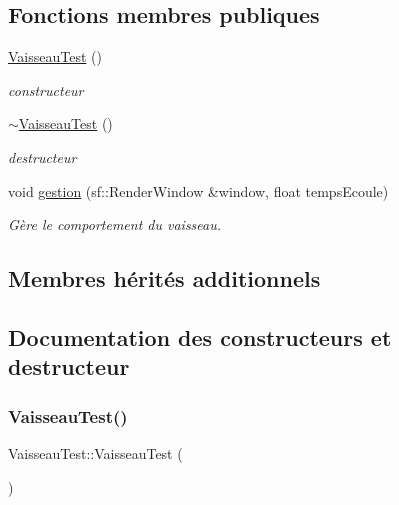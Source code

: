 \subsection*{Fonctions membres publiques}
\begin{DoxyCompactItemize}
\item 
\hyperlink{class_vaisseau_test_acbe01fc8952d9c6fd52cbf311a92c903}{Vaisseau\+Test} ()
\begin{DoxyCompactList}\small\item\em constructeur \end{DoxyCompactList}\item 
\hyperlink{class_vaisseau_test_ada9b5788bc092ecede953248cd6133e8}{$\sim$\+Vaisseau\+Test} ()
\begin{DoxyCompactList}\small\item\em destructeur \end{DoxyCompactList}\item 
void \hyperlink{class_vaisseau_test_a50009e27227a8e1c4d18c16bfba0a55f}{gestion} (sf\+::\+Render\+Window \&window, float temps\+Ecoule)
\begin{DoxyCompactList}\small\item\em Gère le comportement du vaisseau. \end{DoxyCompactList}\end{DoxyCompactItemize}
\subsection*{Membres hérités additionnels}


\subsection{Documentation des constructeurs et destructeur}
\mbox{\label{class_vaisseau_test_acbe01fc8952d9c6fd52cbf311a92c903}} 
\subsubsection{\texorpdfstring{Vaisseau\+Test()}{VaisseauTest()}}
{\footnotesize\ttfamily Vaisseau\+Test\+::\+Vaisseau\+Test (\begin{DoxyParamCaption}{ }\end{DoxyParamCaption})}



